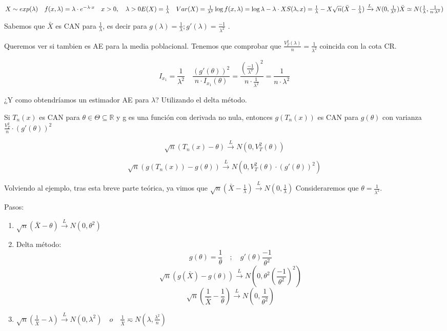 \(
X \sim exp(\lambda) \quad f(x,\lambda)=\lambda \cdot e^{-\lambda \cdot x} \quad x>0, \quad \lambda>0
\\ E(X) = \frac{1}{\lambda} \quad Var(X)=\frac{1}{\lambda^2}
\\ \log f(x,\lambda)= \log \lambda - \lambda \cdot X
\\ S(\lambda,x)=\frac{1}{\lambda}-X
\\ \sqrt{n}(\bar{X}-\frac{1}{\lambda}) \xrightarrow{L} N(0,\frac{1}{\lambda^2})
\\ \bar{X} \simeq N(\frac{1}{\lambda},\frac{1}{n \cdot \lambda^2})
\)

Sabemos que $\bar{X}$ es CAN para $\frac{1}{\lambda}$, es decir para
$g(\lambda)=\frac{1}{\lambda} ;  g'(\lambda)=\frac{-1}{\lambda^2}$
.

Queremos ver si tambien es AE para la media poblacional. Tenemos que comprobar que $\frac{V_T^2(\lambda)}{n}=\frac{1}{\lambda^2}$
coincida con la cota CR.

\[
I_{x_1}=\frac{1}{\lambda^2} \quad \frac{(g'(\theta))^2}{n \cdot I_{x_1}(\theta)}=
\frac{(\frac{-1}{\lambda^2})^2}{n \cdot \frac{1}{\lambda^2}}=\frac{1}{n \cdot \lambda^2}
\]

¿Y como obtendríamos un estimador AE para $\lambda$?
Utilizando el delta método.

Si $T_n(x)$ es CAN para $\theta \in \Theta \subseteq \mathbb{R}$ y g es una función con derivada no nula,
entonces $g(T_n(x))$ es CAN para $g(\theta)$ con varianza $\frac{V_T^2}{n}\cdot (g'(\theta))^2$

$$\sqrt{n}(T_n(x)-\theta) \xrightarrow{L}N(0,V_T^2(\theta))$$

$$\sqrt{n}(g(T_n(x))-g(\theta)) \xrightarrow{L} N(0,V_T^2(\theta)\cdot(g'(\theta))^2)$$

Volviendo al ejemplo, tras esta breve parte teórica, ya vimos que $\sqrt{n}(\bar{X}-\frac{1}{\lambda})\xrightarrow{L} N(0,\frac{1}{\lambda})$
Consideraremos que $\theta=\frac{1}{\lambda^2}$.

Pasos:
\begin{enumerate}
    \item $\sqrt{n}(\bar{X}-\theta)\xrightarrow{L}N(0,\theta^2)$
    \item Delta método:
          \[
          g(\theta)=\frac{1}{\theta} \quad;\quad g'(\theta)\frac{-1}{\theta^2}
          \]
          \[ 
          \sqrt{n}(g(\bar{X})-g(\theta)) \xrightarrow{L} N(0,\theta^2(\frac{-1}{\theta^2})^2)
          \]
          \[
          \sqrt{n}(\frac{1}{\bar{X}}-\frac{1}{\theta}) \xrightarrow{L} N(0,\frac{1}{\theta^2})
          \]
    \item $ \sqrt{n}(\frac{1}{\bar{X}}-\lambda) \xrightarrow{L} N(0,\lambda^2) \quad o \quad
              \frac{1}{\bar{X}}\eqsim N(\lambda,\frac{\lambda^2}{n})$
\end{enumerate}

